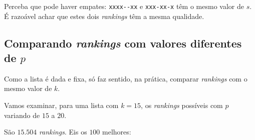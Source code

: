 \documentclass[
  letterpaper,
  DIV=11,
  numbers=noendperiod]{scrreprt}
\begin{document}
Perceba que pode haver empates: \texttt{xxxx-\/-xx} e \texttt{xxx-xx-x}
têm o mesmo valor de $s$. É razoável achar que estes dois
\emph{rankings} têm a mesma qualidade.

\subsection{\texorpdfstring{Comparando \emph{rankings} com valores
diferentes de
$p$}{Comparando rankings com valores diferentes de }}\label{comparando-rankings-com-valores-diferentes-de-p}

Como a lista é dada e fixa, só faz sentido, na prática, comparar
\emph{rankings} com o mesmo valor de $k$.

Vamos examinar, para uma lista com $k = 15$, os \emph{rankings}
possíveis com $p$ variando de $15$ a $20$.

São $15.504$ \emph{rankings}. Eis os $100$ melhores:
\end{document}

